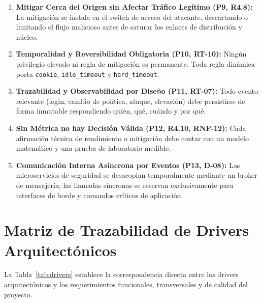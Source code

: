 \documentclass[11pt,a4paper]{report}
\begin{document}
\begin{enumerate}[label=\textbf{P\arabic*.}, leftmargin=*]
    \item \textbf{Mitigar Cerca del Origen sin Afectar Tráfico Legítimo (P9, R4.8):} La mitigación se instala en el switch de acceso del atacante, descartando o limitando el flujo malicioso antes de saturar los enlaces de distribución y núcleo.
    \item \textbf{Temporalidad y Reversibilidad Obligatoria (P10, RT-10):} Ningún privilegio elevado ni regla de mitigación es permanente. Toda regla dinámica porta \texttt{cookie}, \texttt{idle\_timeout} y \texttt{hard\_timeout}.
    \item \textbf{Trazabilidad y Observabilidad por Diseño (P11, RT-07):} Todo evento relevante (login, cambio de política, ataque, elevación) debe persistirse de forma inmutable respondiendo quién, qué, cuándo y por qué.
    \item \textbf{Sin Métrica no hay Decisión Válida (P12, R4.10, RNF-12):} Cada afirmación técnica de rendimiento o mitigación debe contar con un modelo matemático y una prueba de laboratorio medible.
    \item \textbf{Comunicación Interna Asíncrona por Eventos (P13, D-08):} Los microservicios de seguridad se desacoplan temporalmente mediante un broker de mensajería; las llamadas síncronas se reservan exclusivamente para interfaces de borde y comandos críticos de aplicación.
\end{enumerate}

\section{Matriz de Trazabilidad de Drivers Arquitectónicos}
La Tabla~\ref{tab:drivers} establece la correspondencia directa entre los drivers arquitectónicos y los requerimientos funcionales, transversales y de calidad del proyecto.
\end{document}
